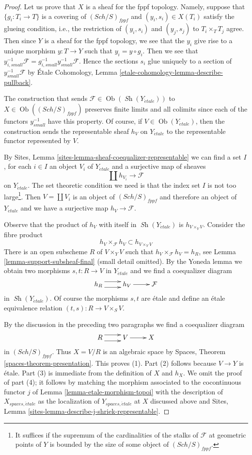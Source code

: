 \documentclass[10pt,a4paper]{amsart}
\theoremstyle{plain}
\theoremstyle{definition}
\theoremstyle{remark}
\numberwithin{equation}{subsection}
\def\Sch{\mathit{Sch}}
\def\Ob{\mathop{\mathrm{Ob}}\nolimits}
\def\Sh{\mathop{\mathit{Sh}}\nolimits}
\def\etale{{\acute{e}tale}}
\begin{document}
\begin{proof}
Let us prove that $X$ is a sheaf for the fppf topology. Namely, suppose
that $\{g_i : T_i \to T\}$ is a covering of $(\Sch/S)_{fppf}$ and
$(y_i, s_i) \in X(T_i)$ satisfy the glueing condition, i.e., the
restriction of $(y_i, s_i)$ and $(y_j, s_j)$ to $T_i \times_T T_j$ agree.
Then since $Y$ is a sheaf for the fppf topology, we see that
the $y_i$ give rise to a unique morphism $y : T \to Y$ such that
$y_i = y \circ g_i$. Then we see that
$y_{i, small}^{-1}\mathcal{F} = g_{i, small}^{-1}y_{small}^{-1}\mathcal{F}$.
Hence the sections $s_i$ glue uniquely to a section of
$y_{small}^{-1}\mathcal{F}$ by
\'Etale Cohomology, Lemma \ref{etale-cohomology-lemma-describe-pullback}.

\medskip\noindent
The construction that sends $\mathcal{F} \in \Ob(\Sh(Y_\etale))$
to $X \in \Ob((\Sch/S)_{fppf})$ preserves finite limits and
all colimits since each of the functors $y_{small}^{-1}$ have
this property. Of course, if $V \in \Ob(Y_\etale)$, then
the construction sends the representable sheaf $h_V$ on $Y_\etale$
to the representable functor represented by $V$.

\medskip\noindent
By Sites, Lemma \ref{sites-lemma-sheaf-coequalizer-representable}
we can find a set $I$, for each $i \in I$ an object $V_i$ of $Y_\etale$
and a surjective map of sheaves
$$
\coprod h_{V_i} \longrightarrow \mathcal{F}
$$
on $Y_\etale$. The set theoretic condition we need is that the index
set $I$ is not too large\footnote{It suffices if the supremum of the
cardinalities of the stalks of $\mathcal{F}$ at geometric points of $Y$
is bounded by the size of some object of $(\Sch/S)_{fppf}$.}.
Then $V = \coprod V_i$ is an object of $(\Sch/S)_{fppf}$ and
therefore an object of $Y_\etale$ and we have a surjective map
$h_V \to \mathcal{F}$.

\medskip\noindent
Observe that the product of $h_V$ with itself in $\Sh(Y_\etale)$
is $h_{V \times_Y V}$. Consider the fibre product
$$
h_V \times_\mathcal{F} h_V \subset h_{V \times_Y V}
$$
There is an open subscheme $R$ of $V \times_Y V$ such that
$h_V \times_\mathcal{F} h_V = h_R$, see
Lemma \ref{lemma-support-subsheaf-final} (small detail omitted).
By the Yoneda lemma we obtain two morphisms $s, t : R \to V$ in $Y_\etale$
and we find a coequalizer diagram
$$
\xymatrix{
h_R \ar@<1ex>[r] \ar@<-1ex>[r] &
h_V \ar[r] &
\mathcal{F}
}
$$
in $\Sh(Y_\etale)$. Of course the morphisms $s, t$ are \'etale
and define an \'etale equivalence relation $(t, s) : R \to V \times_S V$.

\medskip\noindent
By the discussion in the preceding two paragraphs we find a
coequalizer diagram
$$
\xymatrix{
R \ar@<1ex>[r] \ar@<-1ex>[r] &
V \ar[r] &
X
}
$$
in $(\Sch/S)_{fppf}$. Thus $X = V/R$ is an algebraic space by
Spaces, Theorem \ref{spaces-theorem-presentation}. This proves (1).
Part (2) follows because $V \to Y$ is \'etale. Part (3) is immediate
from the definition of $X$ and $h_X$. We omit the proof of part (4);
it follows by matching the morphism associated to the cocontinuous
functor $j$ of Lemma \ref{lemma-etale-morphism-topoi}
with the description of $X_{spaces, \etale}$ as the localization
of $Y_{spaces, \etale}$ at $X$ discussed above and
Sites, Lemma \ref{sites-lemma-describe-j-shriek-representable}.
\end{proof}
\end{document}
